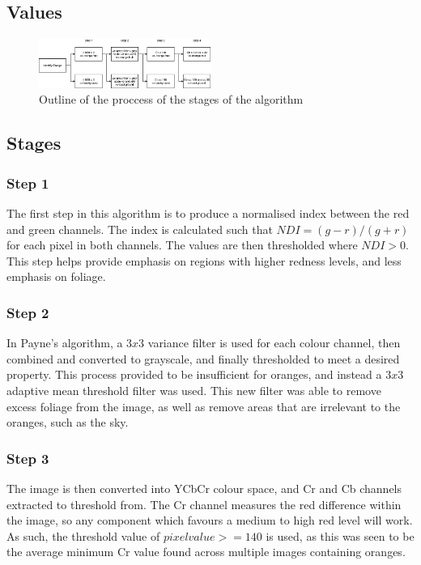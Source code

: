 \documentclass[conference]{IEEEtran}
\begin{document}
\subsection{Values} \label{values}


\begin{figure}[H]
\centerline{\includegraphics[width=0.5\textwidth]{algo_stages}}
\caption{Outline of the proccess of the stages of the algorithm}
\label{fig}
\end{figure}

\subsection{Stages}

\subsubsection{Step 1}
The first step in this algorithm is to produce a normalised index between the red and green channels. The index is calculated such that $NDI = (g - r) / (g + r)$ for each pixel in both channels. The values are then thresholded where $NDI > 0$. This step helps provide emphasis on regions with higher redness levels, and less emphasis on foliage.

\subsubsection{Step 2}
In Payne’s algorithm, a $3x3$ variance filter is used for each colour channel, then combined and converted to grayscale, and finally thresholded to meet a desired property. This process provided to be insufficient for oranges, and instead a $3x3$ adaptive mean threshold filter was used. This new filter was able to remove excess foliage from the image, as well as remove areas that are irrelevant to the oranges, such as the sky.

\subsubsection{Step 3}
The image is then converted into YCbCr colour space, and Cr and Cb channels extracted to threshold from. The Cr channel measures the red difference within the image, so any component which favours a medium to high red level will work. As such, the threshold value of $pixelvalue >= 140$ is used, as this was seen to be the average minimum Cr value found across multiple images containing oranges.
\end{document}
